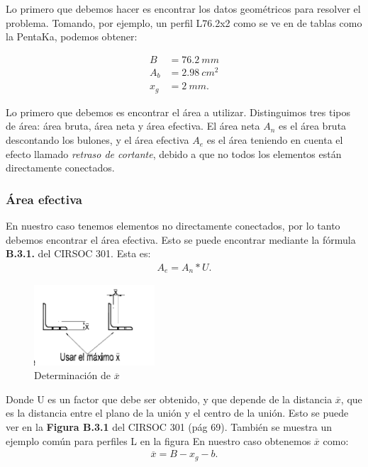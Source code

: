 \documentclass[../main.tex]{subfiles}
\begin{document}
Lo primero que debemos hacer es encontrar los datos geométricos para resolver
el problema. Tomando, por ejemplo, un perfil L76.2x2 como se ve en 
de tablas como la PentaKa, podemos obtener:

\begin{align*}
  B &= \SI{76.2}{mm} \tag{Ancho} \\[5pt]
  A_b &= \SI{2.98}{cm^2} \tag{Área bruta} \\[5pt]
  x_g &= \SI{2}{mm} \tag{Centro de gravedad}
.\end{align*}

Lo primero que debemos es encontrar el área a utilizar. Distinguimos tres tipos
de área: área bruta, área neta y área efectiva. El área neta $A_n$ es el área
bruta descontando los bulones, y el área efectiva  $A_e$ es el área teniendo en
cuenta el efecto llamado  \textit{retraso de cortante}, debido a que no todos 
los elementos están directamente conectados.

\subsubsection{Área efectiva}

En nuestro caso tenemos elementos no directamente conectados, por lo tanto
debemos encontrar el área efectiva. Esto se puede encontrar mediante la fórmula
\textbf{B.3.1.} del CIRSOC 301. Esta es:
\begin{align*}
  A_e = A_n * U
.\end{align*}

\begin{figure}[htpb]
  \centering
  \includegraphics[width=0.4\textwidth]{../images/resumen/x}
  \caption{Determinación de $\overline{x}$}
  \label{fig:x}
\end{figure}

Donde U es un factor que debe ser obtenido, y que depende de la distancia 
$\overline{x}$, que es la distancia entre el plano de la unión y el centro de 
la unión. Esto se puede ver en la \textbf{Figura B.3.1} del CIRSOC 301 (pág 69).
También se muestra un ejemplo común para perfiles L en la figura 
En nuestro caso obtenemos $\overline{x}$ como:
\begin{align*}
  \overline{x} = B - x_g - b
.\end{align*}
\end{document}
